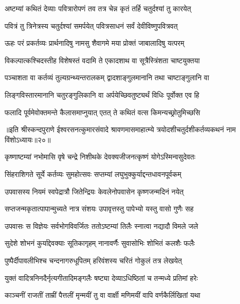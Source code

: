\twolineshloka
{अष्टम्यां कथितं देव्याः पवित्रारोपणं तव}
{तत्र चेन्न कृतं तर्हि चतुर्दश्यां तु कारयेत्} %

\twolineshloka
{पवित्रं तु त्रिनेत्रस्य चतुर्दश्यां समर्पयेत्}
{पवित्रसाधनं सर्वं देवीविष्णुपवित्रवत्} %

\twolineshloka
{ऊहः परं प्रकर्तव्यः प्रार्थनादिषु नामसु}
{शैवागमे मया प्रोक्तं जाबालादिषु यत्परम्} %

\twolineshloka
{विकल्पात्कश्चिदस्तीह विशेषस्तं वदामि ते}
{एकादशाथ वा सूत्रैस्त्रिंशता चाष्टयुक्तया} %

\twolineshloka
{पञ्चाशता वा कर्तव्यं तुल्यग्रन्थ्यन्तरालकम्}
{द्वादशाङ्गुलमानानि तथा चाष्टाङ्गुलानि वा} %

\twolineshloka
{लिङ्गविस्तारमानानि चतुरङ्गुलिकानि वा}
{अर्पयेच्छिवतुष्ट्यर्थं विधिः पूर्वोक्त एव हि} %

\twolineshloka
{फलादि पूर्वमेवोक्तमन्ते कैलासमाप्नुयात्}
{एतत् ते कथितं वत्स किमन्यच्छ्रोतुमिच्छसि} %


{॥इति श्रीस्कन्दपुराणे ईश्वरसनत्कुमारसंवादे श्रावणमासमाहात्म्ये त्रयोदशीचतुर्दशीकर्तव्यकथनं नाम विंशोऽध्यायः॥२०॥}





\twolineshloka
{कृष्णाष्टम्यां नभोमासि वृषे चन्द्रे निशीथके}
{देवक्यजीजनत्कृष्णं योगेऽस्मिन्वसुदेवतः} %

\twolineshloka
{सिंहराशिगते सूर्ये कर्तव्यः सुमहोत्सवः}
{सप्तम्यां लघुभुक्कुर्याद्दन्तधावनपूर्वकम्} %

\twolineshloka
{उपवासस्य नियमं स्वपेद्रात्रौ जितेन्द्रियः}
{केवलेनोपवासेन कृष्णजन्मदिनं नयेत्} %

\twolineshloka
{सप्तजन्मकृतात्पापान्मुच्यते नात्र संशयः}
{उपावृत्तस्तु पापेभ्यो यस्तु वासो गुणैः सह} %

\twolineshloka
{उपवासः स विज्ञेयः सर्वभोगविवर्जितः}
{ततोऽष्टम्यां तिलैः स्नात्वा नद्यादौ विमले जले} %

\twolineshloka
{सुदेशे शोभनं कुर्याद्देवक्याः सूतिकागृहम्}
{नानावर्णैः सुवासोभिः शोभितं कलशैः फलैः} %

\twolineshloka
{पुष्पैर्दीपावलीभिश्च चन्दनागरुधूपितम्}
{हरिवंशस्य चरितं गोकुलं तत्र लेखयेत्} %

\twolineshloka
{युक्तं वादित्रनिनदैर्नृत्यगीतादिमङ्गलैः}
{षष्ट्या देव्याऽधिष्ठितां च तन्मध्ये प्रतिमां हरेः} %

\twolineshloka
{काञ्चनीं राजतीं ताम्रीं पैत्तलीं मृन्मयीं तु वा}
{वार्क्षी मणिमयीं वापि वर्णकैर्लिखितां यथा} %

